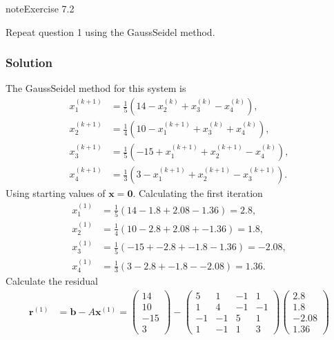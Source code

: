 \documentclass[letterpaper,10pt,english]{jupyterBook}
\begin{document}
\begin{sphinxadmonition}{note}{Exercise 7.2}

\sphinxAtStartPar
Repeat question 1 using the Gauss\sphinxhyphen{}Seidel method.
\subsubsection*{Solution}

\sphinxAtStartPar
The Gauss\sphinxhyphen{}Seidel method for this system is
\begin{align*}
    x_{1}^{(k+1)} &= \frac{1}{5} \left( 14 - x_{2}^{(k)} + x_{3}^{(k)} - x_{4}^{(k)} \right), \\
    x_{2}^{(k+1)} &= \frac{1}{4} \left( 10 - x_{1}^{(k+1)} + x_{3}^{(k)} + x_{4}^{(k)} \right), \\
    x_{3}^{(k+1)} &= \frac{1}{5} \left( -15 + x_{1}^{(k+1)} + x_{2}^{(k+1)} - x_{4}^{(k)} \right), \\
    x_{4}^{(k+1)} &= \frac{1}{3} \left( 3 - x_{1}^{(k+1)} + x_{2}^{(k+1)} - x_{3}^{(k+1)} \right).
\end{align*}
\sphinxAtStartPar
Using starting values of \(\mathbf{x} = \mathbf{0}\). Calculating the first iteration
\begin{align*}
    x_{1}^{(1)} &= \frac{1}{5} \left( 14 - 1.8 + 2.08 - 1.36 \right) = 2.8, \\
    x_{2}^{(1)} &= \frac{1}{4} \left( 10 - 2.8 + 2.08 + -1.36 \right) = 1.8, \\
    x_{3}^{(1)} &= \frac{1}{5} \left( -15 + -2.8 + -1.8 - 1.36 \right) = -2.08, \\
    x_{4}^{(1)} &= \frac{1}{3} \left( 3 - 2.8 + -1.8 - -2.08 \right) = 1.36.
\end{align*}
\sphinxAtStartPar
Calculate the residual
\begin{align*}
    \mathbf{r}^{(1)} &= \mathbf{b} - A \mathbf{x}^{(1)} = 
    \begin{pmatrix} 14 \\ 10 \\ -15 \\ 3 \end{pmatrix} -
    \begin{pmatrix} 5 & 1 & -1 & 1 \\ 1 & 4 & -1 & -1 \\ -1 & -1 & 5 & 1 \\ 1 & -1 & 1 & 3 \end{pmatrix}
    \begin{pmatrix} 2.8 \\ 1.8 \\ -2.08 \\ 1.36 \end{pmatrix} \\

\end{align*}
\end{sphinxadmonition}
\end{document}
